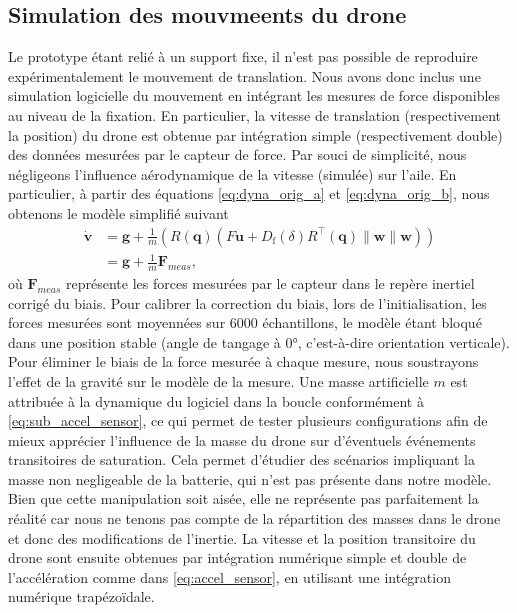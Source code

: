 \subsection{Simulation des mouvmeents du drone}
Le prototype étant relié à un support fixe, il n'est pas possible de reproduire expérimentalement le mouvement de translation.  Nous avons donc inclus une simulation logicielle du mouvement en intégrant les mesures de force disponibles au niveau de la fixation. En particulier, la vitesse de translation (respectivement la position) du drone est obtenue par intégration simple (respectivement double) des données mesurées par le capteur de force. Par souci de simplicité, nous négligeons l'influence aérodynamique de la vitesse (simulée) sur l'aile. En particulier, à partir des équations \eqref{eq:dyna_orig_a} et \eqref{eq:dyna_orig_b}, nous obtenons le modèle simplifié suivant
\begin{subequations}\label{eq:accel_sensor}
    \begin{align}
        \boldsymbol{\dot v} &= \boldsymbol{g} + \frac{1}{m}\left( R(\boldsymbol{q})(F\boldsymbol{u} +  D_{\text{f}}(\delta) R^\top(\boldsymbol{q})\lVert \boldsymbol{w} \rVert \boldsymbol{w}) \right)\\
        &= \boldsymbol{g} + \frac{1}{m} \boldsymbol{F}_{meas} \label{eq:sub_accel_sensor},
    \end{align}
\end{subequations}
où $\boldsymbol{F}_{meas}$ représente les forces mesurées par le capteur dans le repère inertiel corrigé du biais. Pour calibrer la correction du biais, lors de l'initialisation, les forces mesurées sont moyennées sur 6000 échantillons, le modèle étant bloqué dans une position stable (angle de tangage à 0°, c'est-à-dire orientation verticale). Pour éliminer le biais de la force mesurée à chaque mesure, nous soustrayons l'effet de la gravité sur le modèle de la mesure. Une masse artificielle $m$ est attribuée à la dynamique du logiciel dans la boucle conformément à \eqref{eq:sub_accel_sensor}, ce qui permet de tester plusieurs configurations afin de mieux apprécier l'influence de la masse du drone sur d'éventuels événements transitoires de saturation. Cela permet d'étudier des scénarios impliquant la masse non negligeable de la batterie, qui n'est pas présente dans notre modèle. Bien que cette manipulation soit aisée, elle ne représente pas parfaitement la réalité car nous ne tenons pas compte de la répartition des masses dans le drone et donc des modifications de l'inertie.
La vitesse et la position transitoire du drone sont ensuite obtenues par intégration numérique simple et double de l'accélération comme dans \eqref{eq:accel_sensor}, en utilisant une intégration numérique trapézoïdale.

